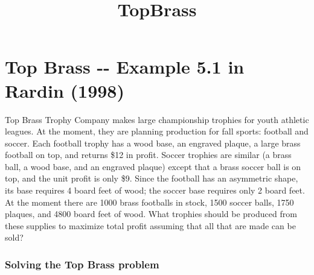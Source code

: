 \documentclass[11pt]{article}
\title{TopBrass}
\begin{document}
    
    
    \maketitle
    
    

    
    \section{Top Brass -\/- Example 5.1 in Rardin
(1998)}\label{top-brass----example-5.1-in-rardin-1998}

    Top Brass Trophy Company makes large championship trophies for youth
athletic leagues. At the moment, they are planning production for fall
sports: football and soccer. Each football trophy has a wood base, an
engraved plaque, a large brass football on top, and returns \$12 in
profit. Soccer trophies are similar (a brass ball, a wood base, and an
engraved plaque) except that a brass soccer ball is on top, and the unit
profit is only \$9. Since the football has an asymmetric shape, its base
requires 4 board feet of wood; the soccer base requires only 2 board
feet. At the moment there are 1000 brass footballs in stock, 1500 soccer
balls, 1750 plaques, and 4800 board feet of wood. What trophies should
be produced from these supplies to maximize total profit assuming that
all that are made can be sold?

    \subsubsection{Solving the Top Brass
problem}\label{solving-the-top-brass-problem}
\end{document}
